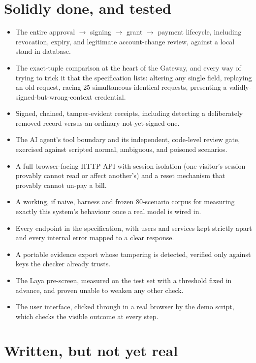 \documentclass[11pt]{report}
\begin{document}
\section{Solidly done, and tested}

\begin{itemize}[leftmargin=2em]
\item The entire approval $\to$ signing $\to$ grant $\to$ payment
      lifecycle, including revocation, expiry, and legitimate
      account-change review, against a local stand-in database.
\item The exact-tuple comparison at the heart of the Gateway, and every
      way of trying to trick it that the specification lists: altering
      any single field, replaying an old request, racing 25 simultaneous
      identical requests, presenting a validly-signed-but-wrong-context
      credential.
\item Signed, chained, tamper-evident receipts, including detecting a
      deliberately removed record versus an ordinary not-yet-signed one.
\item The AI agent's tool boundary and its independent, code-level
      review gate, exercised against scripted normal, ambiguous, and
      poisoned scenarios.
\item A full browser-facing HTTP API with session isolation (one
      visitor's session provably cannot read or affect another's) and a
      reset mechanism that provably cannot un-pay a bill.
\item A working, if naive, harness and frozen 80-scenario corpus for
      measuring exactly this system's behaviour once a real model is
      wired in.
\item Every endpoint in the specification, with users and services kept
      strictly apart and every internal error mapped to a clear response.
\item A portable evidence export whose tampering is detected, verified
      only against keys the checker already trusts.
\item The Laya pre-screen, measured on the test set with a threshold
      fixed in advance, and proven unable to weaken any other check.
\item The user interface, clicked through in a real browser by the demo
      script, which checks the visible outcome at every step.
\end{itemize}

\section{Written, but not yet real}
\end{document}
